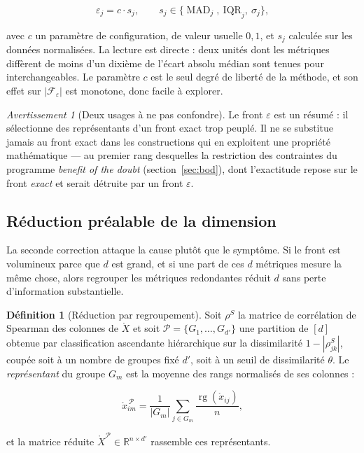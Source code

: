 \documentclass[11pt,a4paper]{article}
\theoremstyle{definition}
\newtheorem{definition}{Définition}[section]
\theoremstyle{remark}
\newtheorem{avertissement}{Avertissement}[section]
\newcommand{\R}{\mathbb{R}}
\newcommand{\abs}[1]{\left\lvert #1 \right\rvert}
\newcommand{\Xor}{\mathring{X}}
\newcommand{\MAD}{\operatorname{MAD}}
\newcommand{\rg}{\operatorname{rg}}
\begin{document}
\medskip

\[
  \varepsilon_j = c \cdot s_j,
  \qquad
  s_j \in \{\MAD_j,\ \mathrm{IQR}_j,\ \sigma_j\},
\]

\bigskip

avec $c$ un paramètre de configuration, de valeur usuelle $0{,}1$, et $s_j$ calculée sur
les données normalisées. La lecture est directe : deux unités dont les métriques diffèrent
de moins d'un dixième de l'écart absolu médian sont tenues pour interchangeables. Le
paramètre $c$ est le seul degré de liberté de la méthode, et son effet sur
$\abs{\mathcal{F}_\varepsilon}$ est monotone, donc facile à explorer.

\medskip

\begin{avertissement}[Deux usages à ne pas confondre]
  \label{av:eps-usage}
  Le front $\varepsilon$ est un résumé : il sélectionne des représentants d'un front
  exact trop peuplé. Il ne se substitue jamais au front exact dans les constructions qui
  en exploitent une propriété mathématique --- au premier rang desquelles la restriction
  des contraintes du programme \emph{benefit of the doubt}
  (section~\ref{sec:bod}), dont l'exactitude repose sur le front \emph{exact} et serait
  détruite par un front $\varepsilon$.
\end{avertissement}

\bigskip

\subsection{Réduction préalable de la dimension}
\label{sec:reduction}

\medskip

La seconde correction attaque la cause plutôt que le symptôme. Si le front est volumineux
parce que $d$ est grand, et si une part de ces $d$ métriques mesure la même chose, alors
regrouper les métriques redondantes réduit $d$ sans perte d'information substantielle.

\medskip

\begin{definition}[Réduction par regroupement]
  \label{def:reduction}
  Soit $\rho^S$ la matrice de corrélation de Spearman des colonnes de $\Xor$ et soit
  $\mathcal{P} = \{G_1,\dots,G_{d'}\}$ une partition de $[d]$ obtenue par classification
  ascendante hiérarchique sur la dissimilarité $1 - \abs{\rho^S_{jk}}$, coupée soit à un
  nombre de groupes fixé $d'$, soit à un seuil de dissimilarité $\theta$. Le
  \emph{représentant} du groupe $G_m$ est la moyenne des rangs normalisés de ses
  colonnes :

  \medskip

  \[
    \mathring{x}^{\,\mathcal{P}}_{im}
    = \frac{1}{\abs{G_m}} \sum_{j \in G_m}
      \frac{\rg(\mathring{x}_{ij})}{n},
  \]

  \bigskip

  et la matrice réduite $\Xor^{\mathcal{P}} \in \R^{n \times d'}$ rassemble ces
  représentants.
\end{definition}
\end{document}

